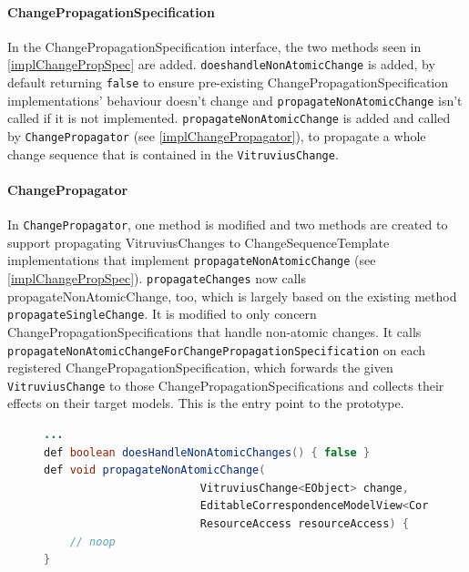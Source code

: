 \paragraph{ChangePropagationSpecification} In the ChangePropagationSpecification interface, the two methods seen in \autoref{implChangePropSpec} are added.
\texttt{doeshandleNonAtomicChange} is added, by default returning \texttt{false} to ensure pre-existing ChangePropagationSpecification implementations' behaviour doesn't change and \texttt{propagateNonAtomicChange} isn't called if it is not implemented.
\texttt{propagateNonAtomicChange} is added and called by \texttt{ChangePropagator} (see \autoref{implChangePropagator}), to propagate a whole change sequence that is contained in the \texttt{VitruviusChange}.

\paragraph{ChangePropagator} In \texttt{ChangePropagator}, one method is modified and two methods are created to support propagating VitruviusChanges to ChangeSequenceTemplate implementations that implement \texttt{propagateNonAtomicChange} (see \autoref{implChangePropSpec}).
\texttt{propagateChanges} now calls propagateNonAtomicChange, too, which is largely based on the existing method \texttt{propagateSingleChange}. It is modified to only concern ChangePropagationSpecifications that handle non-atomic changes.
\newline It calls \texttt{propagateNonAtomicChangeForChangePropagationSpecification} on each registered ChangePropagationSpecification, which forwards the given \texttt{VitruviusChange} to those ChangePropagationSpecifications and collects their effects on their target models.
This is the entry point to the prototype.

\begin{figure}[H]
\centering
\begin{lstlisting}[language=java, caption={Added methods in \emph{ChangePropagationSpecification.xtend}}, captionpos=b, label=implChangePropSpec]
...
def boolean doesHandleNonAtomicChanges() { false }
def void propagateNonAtomicChange(
                        VitruviusChange<EObject> change, 
                        EditableCorrespondenceModelView<Correspondence> correspondenceModel,   
                        ResourceAccess resourceAccess) {
    // noop
}
\end{lstlisting}
\end{figure}

